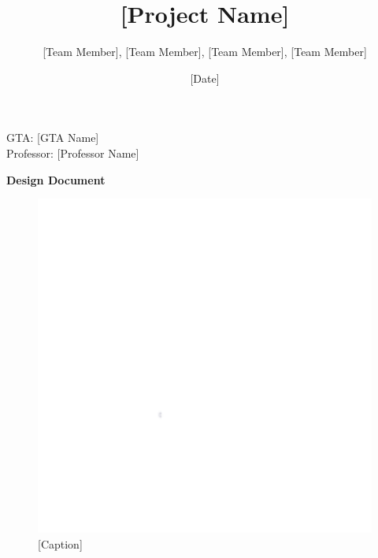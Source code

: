 \documentclass[letterpaper, 11pt]{article}
\begin{document}

\title{[Project Name]}
\author{[Team Member], [Team Member], [Team Member], [Team Member]}
\date{[Date]}
\maketitle
\begin{center}
    GTA: [GTA Name] \\
    Professor: [Professor Name]
\end{center}
\begin{center}
    \textbf{Design Document}
\end{center}

\begin{figure}[h]
    \centering
    \includegraphics[width=12cm,scale=1]{white.png}
    \caption{[Caption]}
\end{figure}


\clearpage
\tableofcontents %

\clearpage
\listoffigures %
\end{document}
